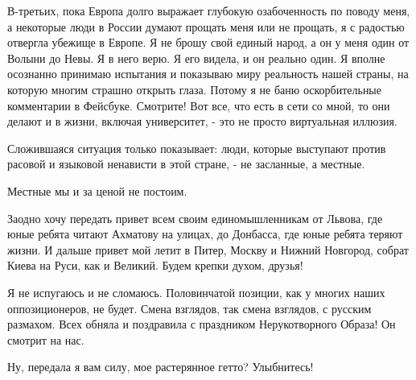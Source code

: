 В-третьих, пока Европа долго выражает глубокую озабоченность по поводу меня, а
некоторые люди в России думают прощать меня или не прощать, я с радостью
отвергла убежище в Европе. Я не брошу свой единый народ, а он у меня один от
Волыни до Невы. Я в него верю. Я его видела, и он реально один. Я вполне
осознанно принимаю испытания и показываю миру реальность нашей страны, на
которую многим страшно открыть глаза. Потому я не баню оскорбительные
комментарии в Фейсбуке. Смотрите! Вот все, что есть в сети со мной, то они
делают и в жизни, включая университет, - это не просто виртуальная иллюзия.

Сложившаяся ситуация только показывает: люди, которые выступают против расовой
и языковой ненависти в этой стране, - не засланные, а местные. 

Местные мы и за ценой не постоим. 

Заодно хочу передать привет всем своим единомышленникам от Львова, где юные
ребята читают Ахматову на улицах, до Донбасса, где юные ребята теряют жизни. И
дальше привет мой летит в Питер, Москву и Нижний Новгород, собрат Киева на
Руси, как и Великий. Будем крепки духом, друзья! 

Я не испугаюсь и не сломаюсь. Половинчатой позиции, как у многих наших
оппозиционеров, не будет. Смена взглядов, так смена взглядов, с русским
размахом. Всех обняла и поздравила с праздником Нерукотворного Образа! Он
смотрит на нас.

Ну, передала я вам силу, мое растерянное гетто? Улыбнитесь!


